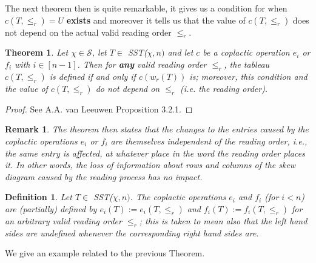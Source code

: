 \documentclass{article}
\newtheorem{thm}{Theorem}
\newtheorem{defn}{Definition}
\newtheorem{rem}{Remark}
\begin{document}
The next theorem then is quite remarkable, it gives us a condition for when $c(T, \leq_r)= U$ \textbf{exists} and moreover it tells us that the value of $c(T, \leq_r)$ does not depend on the actual valid reading order $\leq_r$.
\begin{thm}
Let $\chi \in \mathcal{S}$, let $T \in$ SST($\chi,n)$ and let $c$ be a coplactic operation $e_i$ or $f_i$ with $i \in [n-1]$. Then for \textbf{any} valid reading order $\leq_r$, the tableau $c(T, \leq_r)$ is defined if and only if $c(w_r(T))$ is; moreover, this condition and the value of $c(T, \leq_r)$ do not depend on $\leq_r$ (i.e. the reading order). 
\end{thm}
\begin{proof}
See  A.A. van Leeuwen Proposition 3.2.1.
\end{proof}
\begin{rem}
The theorem then states that the changes to the entries caused by the coplactic operations $e_i$ or $f_i$ are themselves independent of the reading order, i.e., the same entry is affected, at whatever place in the word the reading order places it. In other words, the loss of information about rows and columns of the skew diagram caused by the reading process has no impact. 
\end{rem}
\begin{defn}
Let $T \in$ SST($\chi,n)$. The coplactic operations $e_i$ and $f_i$ (for $i < n$) are (partially) defined by $e_i(T):= e_i(T, \leq_r)$ and $f_i(T):= f_i(T, \leq_r)$ for an arbitrary valid reading order $\leq_r$; this is taken to mean also that the left hand sides are undefined whenever the corresponding right hand sides are. 
\end{defn}
We give an example related to the previous Theorem. 
\end{document}
